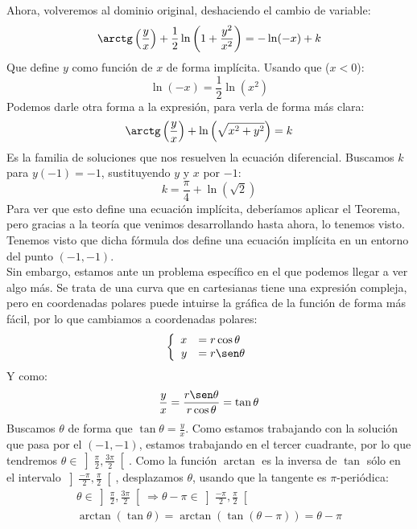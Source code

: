 \begin{ejemplo}
 \noindent
 Ahora, volveremos al dominio original, deshaciendo el cambio de variable:
 \begin{equation*}
     \arctg\left(\dfrac{y}{x}\right) + \dfrac{1}{2}\ln\left(1+\dfrac{y^2}{x^2}\right) = -\ln(-x) + k
 \end{equation*}
 Que define $y$ como función de $x$ de forma implícita. Usando que ($x<0$):
 \begin{equation*}
     \ln(-x) = \dfrac{1}{2}\ln\left(x^2\right)
 \end{equation*}
 Podemos darle otra forma a la expresión, para verla de forma más clara:
 \begin{equation*}
     \arctg\left(\dfrac{y}{x}\right) + \ln\left(\sqrt{x^2+y^2}\right) = k
 \end{equation*}
Es la familia de soluciones que nos resuelven la ecuación diferencial. Buscamos $k$ para $y(-1)=-1$, sustituyendo $y$ y $x$ por $-1$:
\begin{equation*}
    k = \dfrac{\pi}{4} + \ln\left(\sqrt{2}\right)
\end{equation*}
Para ver que esto define una ecuación implícita, deberíamos aplicar el Teorema, pero gracias a la teoría que venimos desarrollando hasta ahora, lo tenemos visto.
Tenemos visto que dicha fórmula dos define una ecuación implícita en un entorno del punto $(-1,-1)$.\\

\noindent
Sin embargo, estamos ante un problema específico en el que podemos llegar a ver algo más.
Se trata de una curva que en cartesianas tiene una expresión compleja, pero en coordenadas polares puede intuirse la gráfica de la función de forma más fácil, por lo que cambiamos a coordenadas polares:
\begin{equation*}
    \left\{\begin{array}{rl}
            x &= r\cos \theta \\
            y &= r\sen \theta
    \end{array}\right.
\end{equation*}
Y como:
\begin{equation*}
    \dfrac{y}{x} = \dfrac{r\sen\theta}{r\cos\theta}=  \tan \theta
\end{equation*}
Buscamos $\theta$ de forma que $\tan\theta = \frac{y}{x}$. Como estamos trabajando con la solución que pasa por el $(-1,-1)$, estamos trabajando en el tercer cuadrante, por lo que tendremos $\theta \in \left]\frac{\pi}{2}, \frac{3\pi}{2}\right[$. Como la función $\arctan$ es la inversa de $\tan$ sólo en el intervalo $\left]\frac{-\pi}{2},\frac{\pi}{2}\right[$, desplazamos $\theta$, usando que la tangente es $\pi$-periódica:
\begin{gather*}
    \theta \in \left]\frac{\pi}{2}, \frac{3\pi}{2}\right[ \Longrightarrow \theta -\pi \in \left]\frac{-\pi}{2},\frac{\pi}{2}\right[ \\
    \arctan(\tan \theta) = \arctan(\tan(\theta - \pi)) = \theta - \pi
\end{gather*}


\end{ejemplo}

